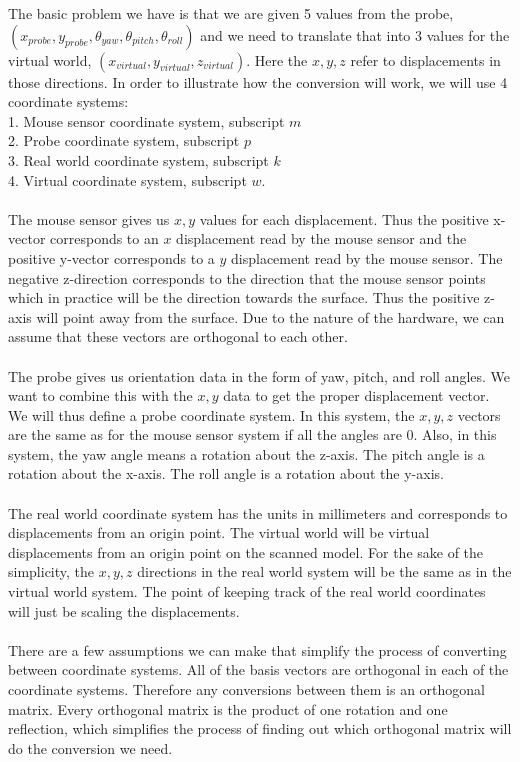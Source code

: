 \documentclass[11pt,psfig]{article}
\begin{document}
The basic problem we have is that we are given 5 values from the probe, $(x_{probe},y_{probe},\theta_{yaw},\theta_{pitch},\theta_{roll})$ and we need to translate that into 3 values for the virtual world, $(x_{virtual},y_{virtual},z_{virtual})$. Here the $x,y,z$ refer to displacements in those directions. In order to illustrate how the conversion will work, we will use 4 coordinate systems:\\
1. Mouse sensor coordinate system, subscript $m$\\
2. Probe coordinate system,  subscript $p$\\
3. Real world coordinate system, subscript $k$\\
4. Virtual coordinate system, subscript $w$.\\
\\
The mouse sensor gives us $x,y$ values for each displacement. Thus the positive x-vector corresponds to an $x$ displacement read by the mouse sensor and the positive y-vector corresponds to a $y$ displacement read by the mouse sensor. The negative z-direction corresponds to the direction that the mouse sensor points which in practice will be the direction towards the surface. Thus the positive z-axis will point away from the surface. Due to the nature of the hardware, we can assume that these vectors are orthogonal to each other.\\
\\
The probe gives us orientation data in the form of yaw, pitch, and roll angles. We want to combine this with the $x,y$ data to get the proper displacement vector. We will thus define a probe coordinate system. In this system, the $x,y,z$ vectors are the same as for the mouse sensor system if all the angles are $0$. Also, in this system, the yaw angle means a rotation about the z-axis. The pitch angle is a rotation about the x-axis. The roll angle is a rotation about the y-axis. \\
\\
The real world coordinate system has the units in millimeters and corresponds to displacements from an origin point. The virtual world will be virtual displacements from an origin point on the scanned model. For the sake of the simplicity, the $x,y,z$ directions in the real world system will be the same as in the virtual world system. The point of keeping track of the real world coordinates will just be scaling the displacements. \\
\\
There are a few assumptions we can make that simplify the process of converting between coordinate systems. All of the basis vectors are orthogonal in each of the coordinate systems. Therefore any conversions between them is an orthogonal matrix. Every orthogonal matrix is the product of one rotation and one reflection, which simplifies the process of finding out which orthogonal matrix will do the conversion we need. \\
\end{document}
